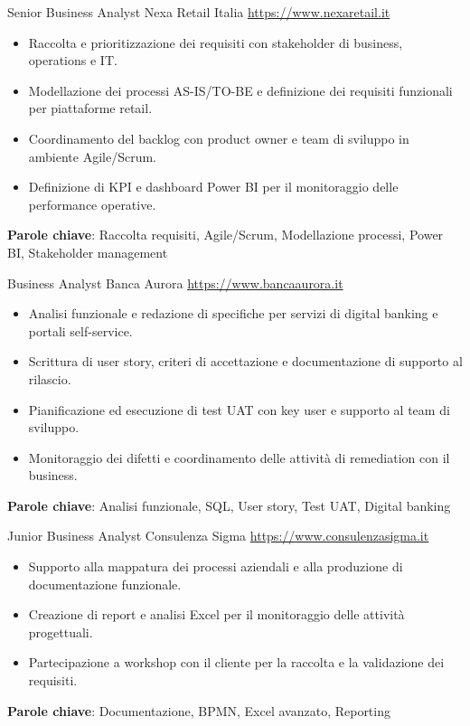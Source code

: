 \documentclass[a4paper, serif, 10pt]{moderncv}
\begin{document}
        {Senior Business Analyst}
        {Nexa Retail Italia}
        {\url{https://www.nexaretail.it}}
        {}
        {\begin{itemize}
\item Raccolta e prioritizzazione dei requisiti con stakeholder di business, operations e IT.
\item Modellazione dei processi AS-IS/TO-BE e definizione dei requisiti funzionali per piattaforme retail.
\item Coordinamento del backlog con product owner e team di sviluppo in ambiente Agile/Scrum.
\item Definizione di KPI e dashboard Power BI per il monitoraggio delle performance operative.
\end{itemize}
\textbf{Parole chiave}: Raccolta requisiti, Agile/Scrum, Modellazione processi, Power BI, Stakeholder management}

        {Business Analyst}
        {Banca Aurora}
        {\url{https://www.bancaaurora.it}}
        {}
        {\begin{itemize}
\item Analisi funzionale e redazione di specifiche per servizi di digital banking e portali self-service.
\item Scrittura di user story, criteri di accettazione e documentazione di supporto al rilascio.
\item Pianificazione ed esecuzione di test UAT con key user e supporto al team di sviluppo.
\item Monitoraggio dei difetti e coordinamento delle attività di remediation con il business.
\end{itemize}
\textbf{Parole chiave}: Analisi funzionale, SQL, User story, Test UAT, Digital banking}

        {Junior Business Analyst}
        {Consulenza Sigma}
        {\url{https://www.consulenzasigma.it}}
        {}
        {\begin{itemize}
\item Supporto alla mappatura dei processi aziendali e alla produzione di documentazione funzionale.
\item Creazione di report e analisi Excel per il monitoraggio delle attività progettuali.
\item Partecipazione a workshop con il cliente per la raccolta e la validazione dei requisiti.
\end{itemize}
\textbf{Parole chiave}: Documentazione, BPMN, Excel avanzato, Reporting}
\end{document}
